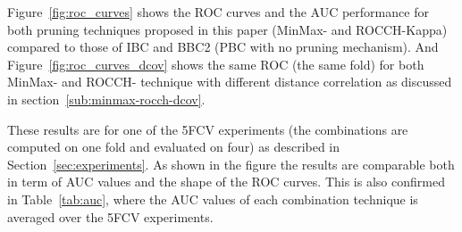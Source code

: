 \begin{table}[b]
    \small
    \centering
    \renewcommand{\arraystretch}{1.3}
    \caption{Comparison of pruning and combination time (seconds) and number of Boolean operations required to achieve the final ROCCH during the design phase, and the number of selected detectors during the operational phase. All values are averaged over 5FCV.}
    \label{tab:time-complexity}
    \centering
\end{table}


Figure~\ref{fig:roc_curves} shows the ROC curves and the AUC performance for both pruning techniques proposed in this paper (MinMax- and ROCCH-Kappa) compared to those of IBC and BBC2 (PBC with no pruning mechanism). And Figure~\ref{fig:roc_curves_dcov} shows the same ROC (the same fold) for both MinMax- and ROCCH- technique with different distance correlation as discussed in section~\ref{sub:minmax-rocch-dcov}.

These results are for one of the 5FCV experiments (the combinations are computed on one fold and evaluated on four) as described in Section~\ref{sec:experiments}.
As shown in the figure the results are comparable both in term of AUC values and the shape of the ROC curves.
This is also confirmed in Table~\ref{tab:auc}, where the AUC values of each combination technique is averaged over the 5FCV experiments.

